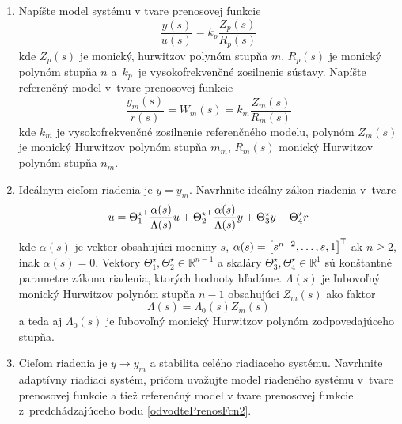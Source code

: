 \documentclass[a4paper, 10pt, ]{article}
\begin{document}
\begin{enumerate}[leftmargin=0pt, labelsep=4mm, itemsep=0pt]
	\begin{enumerate}[leftmargin=0pt, labelsep=4mm, itemsep=0pt]

		\item Napíšte model systému v tvare prenosovej funkcie \label{odvodtePrenosFcn2}
		\begin{equation*}
            \frac{y(s)}{u(s)} = k_p \frac{Z_p(s)}{R_p(s)}
		\end{equation*}
		kde $Z_p(s)$ je monický, hurwitzov polynóm stupňa $m$, $R_p(s)$ je monický polynóm stupňa $n$ a~$k_p$~je  vysokofrekvenčné zosilnenie sústavy. Napíšte referenčný model v~tvare prenosovej funkcie
		\begin{equation*}
			\frac{y_m(s)}{r(s)} = W_m(s) = k_m \frac{Z_m(s)}{R_m(s)}
		\end{equation*}
		kde $k_m$ je vysokofrekvenčné zosilnenie referenčného modelu, polynóm $Z_m(s)$ je monický Hurwitzov polynóm stupňa $m_m$, $R_m(s)$ monický Hurwitzov polynóm stupňa $n_m$.

		\item Ideálnym cieľom riadenia je $y = y_m$. Navrhnite ideálny zákon riadenia v~tvare
		\begin{equation*}
			u = {\Theta_1^\star}^{\mathsf{T}} \frac{\alpha(s)}{\Lambda(s)} u + {\Theta_2^\star}^{\mathsf{T}} \frac{\alpha(s)}{\Lambda(s)} y + \Theta_3^\star y + \Theta_4^\star r
		\end{equation*}
		kde $\alpha(s)$ je vektor obsahujúci mocniny $s$, $\alpha(s) = \begin{bmatrix} s^{n-2}, \ldots,s, 1 \end{bmatrix}^{\mathsf{T}}$ ak $n\geq 2$, inak $\alpha(s) = 0$. Vektory $\Theta_1^\star, \Theta_2^\star \in \mathbb{R}^{n-1}$ a  skaláry $\Theta_3^\star, \Theta_4^\star \in \mathbb{R}^1$ sú konštantné parametre zákona riadenia, ktorých hodnoty hľadáme.  $\Lambda(s)$ je ľubovoľný monický Hurwitzov polynóm stupňa $n-1$ obsahujúci $Z_m(s)$ ako faktor
		\begin{equation*}
			\Lambda(s) = \Lambda_0(s) Z_m(s)
		\end{equation*}
		a teda aj $\Lambda_0(s)$ je ľubovoľný monický Hurwitzov polynóm zodpovedajúceho stupňa.

		\item Cieľom riadenia je $y \to y_m$ a stabilita celého riadiaceho systému. Navrhnite adaptívny riadiaci systém, pričom uvažujte model riadeného systému v~tvare prenosovej funkcie  a tiež referenčný model v tvare prenosovej funkcie z~predchádzajúceho bodu \ref{odvodtePrenosFcn2}.

	\end{enumerate}






\end{enumerate}
\end{document}
